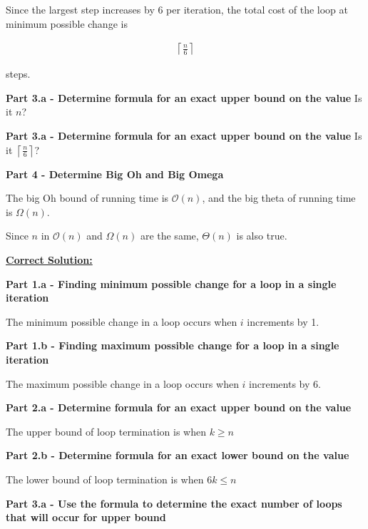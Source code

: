 \documentclass[12pt]{article}
\begin{document}
\begin{enumerate}[a.]
    Since the largest step increases by 6 per iteration, the total cost of the
    loop at minimum possible change is

    \begin{align}
        \left\lceil \frac{n}{6} \right\rceil
    \end{align}

    steps.

    \textbf{Part 3.a - Determine formula for an exact upper bound on the value}
    Is it $n$?

    \textbf{Part 3.a - Determine formula for an exact upper bound on the value}
    Is it $\left\lceil \frac{n}{6} \right\rceil$?

    \textbf{Part 4 - Determine Big Oh and Big Omega}

    The big Oh bound of running time is $\mathcal{O}(n)$, and the big theta of
    running time is $\Omega(n)$.

    \bigskip

    Since $n$ in $\mathcal{O}(n)$ and  $\Omega(n)$ are the same, $\Theta(n)$ is
    also true.

    \begin{mdframed}

    \bigskip

    \underline{\textbf{Correct Solution:}}

    \bigskip

    \textbf{Part 1.a - Finding minimum possible change for a loop in a single iteration}

    The minimum possible change in a loop occurs when $i$ increments by 1.

    \textbf{Part 1.b - Finding maximum possible change for a loop in a single iteration}

    The maximum possible change in a loop occurs when $i$ increments by 6.

    \color{red}
    \textbf{Part 2.a - Determine formula for an exact upper bound on the value}

    The upper bound of loop termination is when $k\geq n$


    \textbf{Part 2.b - Determine formula for an exact lower bound on the value}

    The lower bound of loop termination is when $6k \leq n$

    \textbf{Part 3.a - Use the formula to determine the exact number of loops that will occur for upper bound}

    \bigskip


\end{mdframed}
\end{enumerate}
\end{document}
